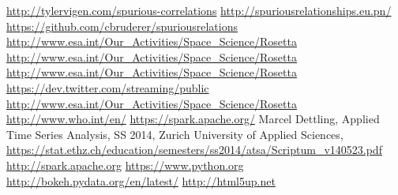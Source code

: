 \documentclass[12pt, a4paper]{article}
\begin{document}
\begin{thebibliography}{9}

\url{http://tylervigen.com/spurious-correlations}
\url{http://spuriousrelationships.eu.pn/}
\url{https://github.com/cbruderer/spuriousrelations}
\url{http://www.esa.int/Our_Activities/Space_Science/Rosetta}
\url{http://www.esa.int/Our_Activities/Space_Science/Rosetta}
\url{http://www.esa.int/Our_Activities/Space_Science/Rosetta}
\url{https://dev.twitter.com/streaming/public}
\url{http://www.esa.int/Our_Activities/Space_Science/Rosetta}
\url{http://www.who.int/en/}
\url{https://spark.apache.org/}
 Marcel Dettling, Applied Time Series Analysis, SS 2014, Zurich University of Applied Sciences, \url{https://stat.ethz.ch/education/semesters/ss2014/atsa/Scriptum_v140523.pdf}
\url{http://spark.apache.org}
\url{https://www.python.org}
\url{http://bokeh.pydata.org/en/latest/}
\url{http://html5up.net}

\end{thebibliography}
\end{document}
